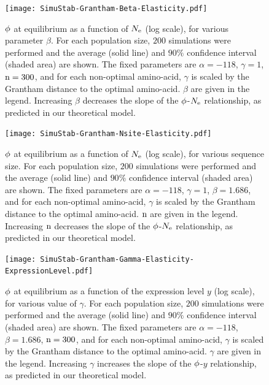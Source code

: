 \begin{figure}[H]
	\centering
	\texttt{[image: SimuStab-Grantham-Beta-Elasticity.pdf]}
	\caption[Effect of $\beta$ on the susceptibility]{
	$\phi$ at equilibrium as a function of $N_{\mathrm{e}}$ (log scale), for various parameter $\beta$.
	For each population size, $200$ simulations were performed and the average (solid line) and $90\%$ confidence interval (shaded area) are shown.
	The fixed parameters are $\alpha=-118$, $\gamma=1$, $\text{n}=300$, and for each non-optimal amino-acid, $\gamma$ is scaled by the Grantham distance to the optimal amino-acid. $\beta$ are given in the legend.
	Increasing $\beta$ decreases the slope of the $\phi$-$N_{\mathrm{e}}$ relationship, as predicted in our theoretical model.
	}
\end{figure}

\begin{figure}[H]
	\centering
	\texttt{[image: SimuStab-Grantham-Nsite-Elasticity.pdf]}
	\caption[Effect of sequence size on the susceptibility]{
	$\phi$ at equilibrium as a function of $N_{\mathrm{e}}$ (log scale), for various sequence size.
	For each population size, $200$ simulations were performed and the average (solid line) and $90\%$ confidence interval (shaded area) are shown.
	The fixed parameters are $\alpha=-118$, $\gamma=1$, $\beta=1.686$, and for each non-optimal amino-acid, $\gamma$ is scaled by the Grantham distance to the optimal amino-acid. $\text{n}$ are given in the legend.
	Increasing $\text{n}$ decreases the slope of the $\phi$-$N_{\mathrm{e}}$ relationship, as predicted in our theoretical model.
	}
\end{figure}

\begin{figure}[H]
	\centering
	\texttt{[image: SimuStab-Grantham-Gamma-Elasticity-ExpressionLevel.pdf]}
	\caption[Effect of $\gamma$ on the susceptibility with regards to expression level]{
	$\phi$ at equilibrium as a function of the expression level $y$ (log scale), for various value of $\gamma$.
	For each population size, $200$ simulations were performed and the average (solid line) and $90\%$ confidence interval (shaded area) are shown.
	The fixed parameters are $\alpha=-118$, $\beta=1.686$, $\text{n}=300$, and for each non-optimal amino-acid, $\gamma$ is scaled by the Grantham distance to the optimal amino-acid. $\gamma$ are given in the legend.
	Increasing $\gamma$ increases the slope of the $\phi$-$y$ relationship, as predicted in our theoretical model.
	}
\end{figure}

